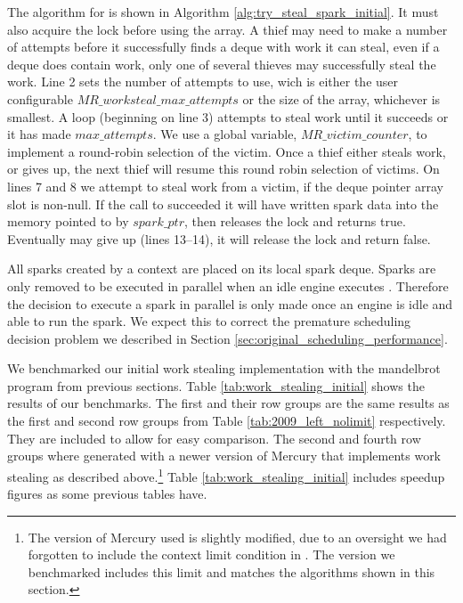 The algorithm for \trystealspark is shown in 
Algorithm \ref{alg:try_steal_spark_initial}.
It must also acquire the lock before using the array.
A thief may need to make a number of attempts before it successfully finds a
deque with work it can steal,
even if a deque does contain work, only one of several thieves may
successfully steal the work.
Line 2 sets the number of attempts to use, wich is either the user
configurable $MR\_worksteal\_max\_attempts$ or the size of the array,
whichever is smallest.
A loop (beginning on line 3) attempts to steal work until it succeeds or it
has made $max\_attempts$.
We use a global variable, $MR\_victim\_counter$,
to implement a round-robin selection of the victim.
Once a thief either steals work, or gives up, the next thief will resume
this round robin selection of victims.
On lines 7 and 8 we attempt to steal work from a victim,
if the deque pointer array slot is non-null.
If the call to \steal succeeded it will have written spark data into the
memory pointed to by $spark\_ptr$,
then \trystealspark releases the lock and returns true.
Eventually \trystealspark may give up (lines 13--14),
it will release the lock and return false.

All sparks created by a context are placed on its local spark deque.
Sparks are only removed to be executed in parallel when an idle engine
executes \trystealspark.
Therefore
the decision to execute a spark in parallel is only made once an engine is
idle and able to run the spark.
We expect this to correct the premature scheduling decision problem we
described in Section \ref{sec:original_scheduling_performance}.



We benchmarked our initial work stealing implementation with the mandelbrot
program from previous sections.
Table \ref{tab:work_stealing_initial} shows the results of our benchmarks.
The first and their row groups are the same results as the first and second
row groups from Table \ref{tab:2009_left_nolimit} respectively.
They are included to allow for easy comparison. 
The second and fourth row groups where generated with a newer version of
Mercury that implements work stealing as described above.\footnote{
    The version of Mercury used is slightly modified,
    due to an oversight we had forgotten to include the context limit
    condition in \getglobalwork.
    The version we benchmarked includes this limit and matches the
    algorithms shown in this section.}
Table \ref{tab:work_stealing_initial} includes speedup figures as some
previous tables have.

